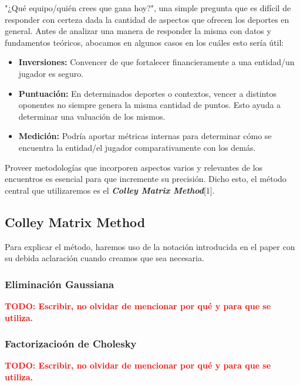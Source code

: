 "¿Qu\'e equipo/qui\'en crees que gana hoy?", una simple pregunta que es dif\'icil de responder con certeza dada la cantidad de aspectos que ofrecen los deportes en general. Antes de analizar una manera de responder la misma con datos y fundamentos te\'oricos, abocamos en algunos casos en los cuáles esto ser\'ia \'util:

\begin{itemize}
\item \textbf{Inversiones:} Convencer de que fortalecer financieramente a una entidad/un jugador es seguro.
\item \textbf{Puntuaci\'on:} En determinados deportes o contextos, vencer a distintos oponentes no siempre genera la misma cantidad de puntos. Esto ayuda a determinar una valuaci\'on de los mismos.
\item \textbf{Medici\'on:} Podr\'ia aportar m\'etricas internas para determinar c\'omo se encuentra la entidad/el jugador comparativamente con los dem\'as.
\end{itemize}

Proveer metodolog\'ias que incorporen aspectos varios y relevantes de los encuentros es esencial para que incremente su precisión. Dicho esto, el m\'etodo central que utilizaremos es el \textbf{\textit{Colley Matrix Method}}[1].

\subsection{Colley Matrix Method}

Para explicar el m\'etodo, haremos uso de la notaci\'on introducida en el paper con su debida aclaraci\'on cuando creamos que sea necesaria.

\subsubsection{Eliminaci\'on Gaussiana}

\textcolor{red}{\textbf{TODO: Escribir, no olvidar de mencionar por qu\'e y para que se utiliza.}}

\subsubsection{Factorizacio\'on de Cholesky}

\textcolor{red}{\textbf{TODO: Escribir, no olvidar de mencionar por qu\'e y para que se utiliza.}}
